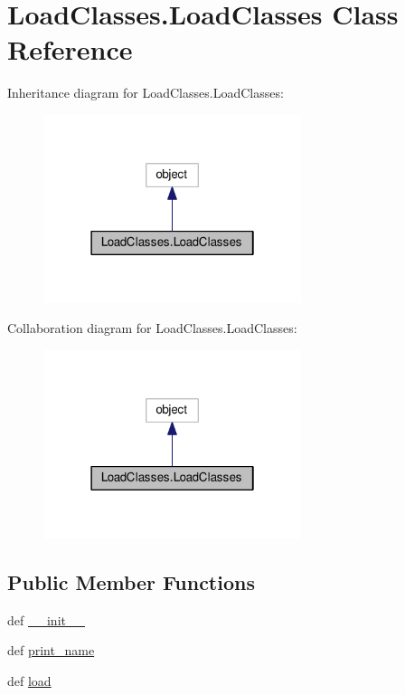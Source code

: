 \hypertarget{classLoadClasses_1_1LoadClasses}{\section{Load\-Classes.\-Load\-Classes Class Reference}
\label{classLoadClasses_1_1LoadClasses}
}


Inheritance diagram for Load\-Classes.\-Load\-Classes\-:
\nopagebreak
\begin{figure}[H]
\begin{center}
\leavevmode
\includegraphics[width=214pt]{classLoadClasses_1_1LoadClasses__inherit__graph}
\end{center}
\end{figure}


Collaboration diagram for Load\-Classes.\-Load\-Classes\-:
\nopagebreak
\begin{figure}[H]
\begin{center}
\leavevmode
\includegraphics[width=214pt]{classLoadClasses_1_1LoadClasses__coll__graph}
\end{center}
\end{figure}
\subsection*{Public Member Functions}
\begin{DoxyCompactItemize}
\item 
def \hyperlink{classLoadClasses_1_1LoadClasses_a9fe946ad6f966eb19a8877931c1dfe93}{\-\_\-\-\_\-init\-\_\-\-\_\-}
\item 
def \hyperlink{classLoadClasses_1_1LoadClasses_a4f90a379d556b30d456f402f8b368bee}{print\-\_\-name}
\item 
def \hyperlink{classLoadClasses_1_1LoadClasses_a9be449b4da8e5ab786f79c6388820727}{load}
\end{DoxyCompactItemize}
